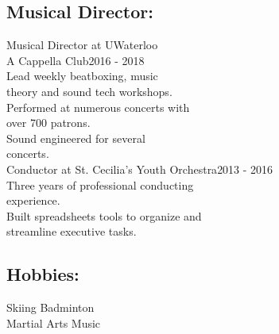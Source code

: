 \documentclass[letterpaper]{kevin-resume} %
\begin{document}
{\begin{minipage}[t]{0.30\textwidth}
\subsection{Musical Director:}
{Musical Director at UWaterloo\\ A Cappella Club}\hspace{10mm}2016 - 2018\\
	\textbullet{} Lead weekly beatboxing, music\\
	\hspace{3mm}theory and sound tech workshops.\\
	\textbullet{} Performed at numerous concerts with\\
	\hspace{3mm}over 700 patrons.\\
	\textbullet{} Sound engineered for several\\
	\hspace{3mm}concerts.\\
{Conductor at St. Cecilia’s Youth Orchestra}\hspace{18mm}2013 - 2016\\
	\textbullet{} Three years of professional conducting\\
	\hspace{3mm}experience.\\
	\textbullet{} Built spreadsheets tools to organize and\\
	\hspace{3mm}streamline executive tasks.

\sectionspace %
\subsection{Hobbies:}
Skiing \textbullet{} 
Badminton \\
Martial Arts \textbullet{} 
Music

\hspace{5mm}
\end{minipage}} %


\end{document}
